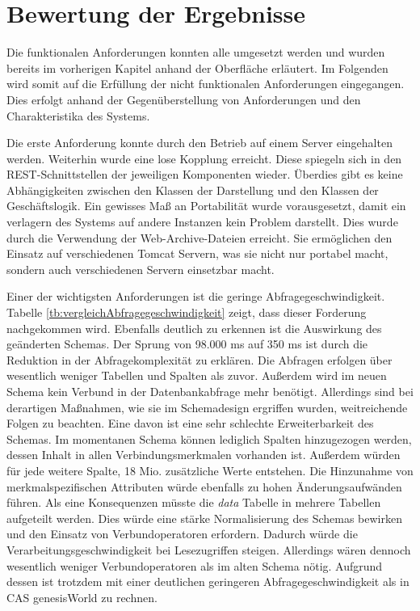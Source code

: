 \section{Bewertung der Ergebnisse}
\label{ch:Ergebnis:sec:bewertung}

Die funktionalen Anforderungen konnten alle umgesetzt werden und wurden bereits im vorherigen Kapitel anhand der Oberfläche erläutert. Im Folgenden wird somit auf die Erfüllung der nicht funktionalen Anforderungen eingegangen. Dies erfolgt anhand der Gegenüberstellung von Anforderungen und den Charakteristika des Systems.

Die erste Anforderung konnte durch den Betrieb auf einem Server eingehalten werden. Weiterhin wurde eine lose Kopplung erreicht. Diese spiegeln sich in den REST-Schnittstellen der jeweiligen Komponenten wieder. Überdies gibt es keine Abhängigkeiten zwischen den Klassen der Darstellung und den Klassen der Geschäftslogik. Ein gewisses Maß an Portabilität wurde vorausgesetzt, damit ein verlagern des Systems auf andere Instanzen kein Problem darstellt. Dies wurde durch die Verwendung der Web-Archive-Dateien erreicht. Sie ermöglichen den Einsatz auf verschiedenen Tomcat Servern, was sie nicht nur portabel macht, sondern auch verschiedenen Servern einsetzbar macht. 

Einer der wichtigsten Anforderungen ist die geringe Abfragegeschwindigkeit. Tabelle \ref{tb:vergleichAbfragegeschwindigkeit} zeigt, dass dieser Forderung nachgekommen wird. Ebenfalls deutlich zu erkennen ist die Auswirkung des geänderten Schemas. Der Sprung von 98.000 ms auf 350 ms ist durch die Reduktion in der Abfragekomplexität zu erklären. Die Abfragen erfolgen über wesentlich weniger Tabellen und Spalten als zuvor. Außerdem wird im neuen Schema kein Verbund in der Datenbankabfrage mehr benötigt. Allerdings sind bei derartigen Maßnahmen, wie sie im Schemadesign ergriffen wurden, weitreichende Folgen zu beachten. Eine davon ist eine sehr schlechte Erweiterbarkeit des Schemas. Im momentanen Schema können lediglich Spalten hinzugezogen werden, dessen Inhalt in allen Verbindungsmerkmalen vorhanden ist. Außerdem würden für jede weitere Spalte, 18 Mio. zusätzliche Werte entstehen. Die Hinzunahme von merkmalspezifischen Attributen würde ebenfalls zu hohen Änderungsaufwänden führen. Als eine Konsequenzen müsste die \textit{data} Tabelle in mehrere Tabellen aufgeteilt werden. Dies würde eine stärke Normalisierung des Schemas bewirken und den Einsatz von Verbundoperatoren erfordern. Dadurch würde die Verarbeitungsgeschwindigkeit bei Lesezugriffen steigen. Allerdings wären dennoch wesentlich weniger Verbundoperatoren als im alten Schema nötig. Aufgrund dessen ist trotzdem mit einer deutlichen geringeren Abfragegeschwindigkeit als in CAS genesisWorld zu rechnen.  

